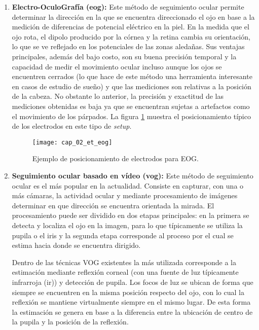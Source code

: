 \documentclass[../Main.tex]{subfiles}
\begin{document}
\begin{enumerate}
				\item \textbf{Electro-OculoGrafía (\acrshort{eog}):} Este método de seguimiento ocular permite determinar la dirección en la que se encuentra direccionado el ojo en base a la medición de diferencias de potencial eléctrico en la piel. En la medida que el ojo rota, el dipolo producido por la córnea y la retina cambia su orientación, lo que se ve reflejado en los potenciales de las zonas aledañas. Sus ventajas principales, además del bajo costo, son su buena precisión temporal y la capacidad de medir el movimiento ocular incluso aunque los ojos se encuentren cerrados (lo que hace de este método una herramienta interesante en casos de estudio de sueño) y que las mediciones son relativas a la posición de la cabeza. No obstante lo anterior, la precisión y exactitud de las mediciones obtenidas es baja ya que se encuentran sujetas a artefactos como el movimiento de los párpados. La figura \ref{fig:02_et_eog} muestra el posicionamiento típico de los electrodos en este tipo de \textit{\gls{setup}}. 
				\begin{figure}[H]
					\centering
					\texttt{[image: cap\_02\_et\_eog]}
					\caption[Ejemplo de posicionamiento de electrodos para EOG]{Ejemplo de posicionamiento de electrodos para EOG\footnotemark.}
					\label{fig:02_et_eog}
				\end{figure}

				\item \textbf{Seguimiento ocular basado en vídeo (\acrshort{vog}):} Este método de seguimiento ocular es el más popular en la actualidad. Consiste en capturar, con una o más cámaras, la actividad ocular y mediante procesamiento de imágenes determinar en que dirección se encuentra orientada la mirada. El procesamiento puede ser dividido en dos etapas principales: en la primera se detecta y localiza el ojo en la imagen, para lo que típicamente se utiliza la pupila o el iris y la segunda etapa corresponde al proceso por el cual se estima hacia donde se encuentra dirigido. 

				Dentro de las técnicas VOG existentes la más utilizada corresponde a la estimación mediante reflexión corneal (con una fuente de luz típicamente infrarroja (\acrshort{ir})) y detección de pupila. Los focos de luz se ubican de forma que siempre se encuentren en la misma posición respecto del ojo, con lo cual la reflexión se mantiene virtualmente siempre en el mismo lugar. De esta forma la estimación se genera en base a la diferencia entre la ubicación de centro de la pupila y la posición de la reflexión.  


\end{enumerate}
\end{document}
